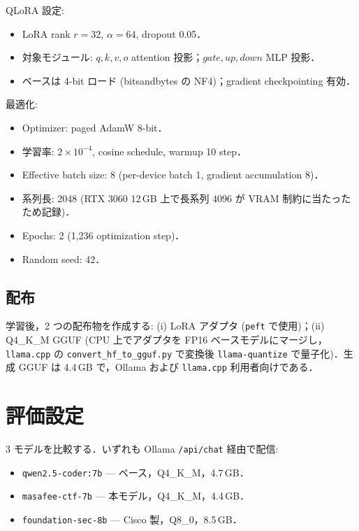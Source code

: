 \documentclass[10pt,twocolumn,a4paper]{ltjsarticle}
\begin{document}
QLoRA 設定:

\begin{itemize}
\item LoRA rank $r = 32$, $\alpha = 64$, dropout 0.05．
\item 対象モジュール: $q, k, v, o$ attention 投影；$gate, up, down$ MLP 投影．
\item ベースは 4-bit ロード (bitsandbytes の NF4)；gradient checkpointing 有効．
\end{itemize}

最適化:
\begin{itemize}
\item Optimizer: paged AdamW 8-bit．
\item 学習率: $2\times 10^{-4}$, cosine schedule, warmup 10 step．
\item Effective batch size: 8 (per-device batch 1, gradient accumulation 8)．
\item 系列長: 2048 (RTX 3060 12\,GB 上で長系列 4096 が VRAM 制約に当たったため記録)．
\item Epochs: 2 (1{,}236 optimization step)．
\item Random seed: 42．
\end{itemize}

\subsection{配布}

学習後，2 つの配布物を作成する: (i) LoRA アダプタ (\texttt{peft} で使用)；(ii) Q4{\_}K{\_}M GGUF (CPU 上でアダプタを FP16 ベースモデルにマージし，\texttt{llama.cpp} の \texttt{convert\_hf\_to\_gguf.py} で変換後 \texttt{llama-quantize} で量子化)．生成 GGUF は 4.4\,GB で，Ollama および \texttt{llama.cpp} 利用者向けである．

\section{評価設定}

3 モデルを比較する．いずれも Ollama \texttt{/api/chat} 経由で配信:

\begin{itemize}
\item \texttt{qwen2.5-coder:7b} --- ベース，Q4{\_}K{\_}M，4.7\,GB．
\item \texttt{masafee-ctf-7b} --- 本モデル，Q4{\_}K{\_}M，4.4\,GB．
\item \texttt{foundation-sec-8b} --- Cisco 製，Q8{\_}0，8.5\,GB．
\end{itemize}
\end{document}
